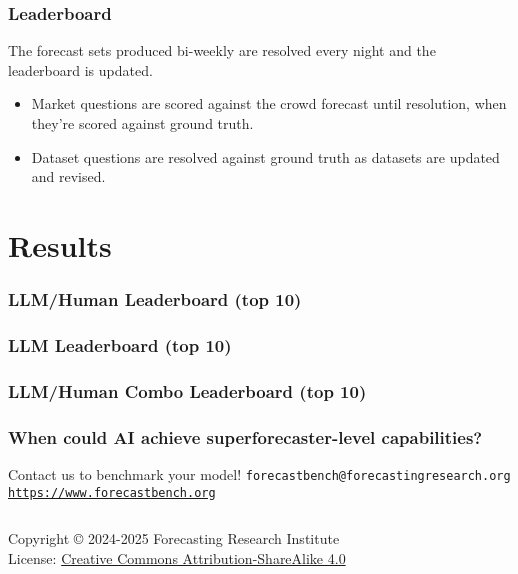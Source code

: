 \documentclass[aspectratio=169]{beamer}
\begin{document}
\begin{frame}
  \frametitle{Leaderboard}
  The forecast sets produced bi-weekly are resolved every night and the leaderboard is updated.
  \begin{itemize}
  \item Market questions are scored against the crowd forecast until resolution, when they're scored against ground truth.
  \item Dataset questions are resolved against ground truth as datasets are updated and revised.
  \end{itemize}

\end{frame}


\section{Results}


\begin{frame}[fragile=singleslide]
  \frametitle{LLM/Human Leaderboard (top 10)}
  
\end{frame}


\begin{frame}[fragile=singleslide]
  \frametitle{LLM Leaderboard (top 10)}
  
\end{frame}


\begin{frame}[fragile=singleslide]
  \frametitle{LLM/Human Combo Leaderboard (top 10)}
  
\end{frame}

\begin{frame}[fragile=singleslide]
  \frametitle{When could AI achieve superforecaster-level capabilities?}
  
\end{frame}


\begin{frame}
  \begin{center}
    \vfill
    {\LARGE Contact us to benchmark your model!}
    \vfill
    {\LARGE \texttt{forecastbench@forecastingresearch.org}}
    \vfill
    {\LARGE \href{https://www.forecastbench.org/}{\texttt{https://www.forecastbench.org}}}
    \vfill
  \end{center}
  \vfill
  \begin{columns}[T]

    \ccbysa
    \tiny
    Copyright © 2024-2025 Forecasting Research Institute \\
    License: \href{http://creativecommons.org/licenses/by-sa/4.0/}{Creative
      Commons Attribution-ShareAlike 4.0}
  \end{columns}
\end{frame}
\end{document}
